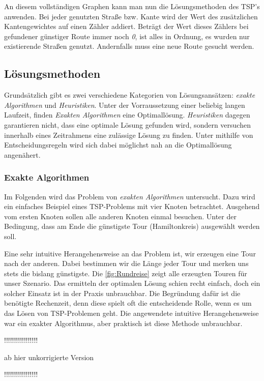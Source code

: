 \documentclass{article}
\begin{document}
An diesem vollständigen Graphen kann man nun die Lösungsmethoden des TSP's anwenden. Bei jeder genutzten Straße bzw. Kante wird der Wert des zusätzlichen Kantengewichtes auf einen Zähler addiert. Beträgt der Wert dieses Zählers bei gefundener günstiger Route immer noch \textit{0}, ist alles in Ordnung, es wurden nur existierende Straßen genutzt. Andernfalls muss eine neue Route gesucht werden.


\subsection{Lösungsmethoden}

Grundsätzlich gibt es zwei verschiedene Kategorien von Lösungsansätzen: \textit{exakte Algorithmen} und \textit{Heuristiken}. Unter der Vorraussetzung einer beliebig langen Laufzeit, finden \textit{Exakten Algorithmen} eine Optimallösung. \textit{Heuristiken} dagegen garantieren nicht, dass eine optimale Lösung gefunden wird, sondern versuchen innerhalb eines Zeitrahmens eine zulässige Lösung zu finden. Unter mithilfe von Entscheidungsregeln wird sich dabei möglichst nah an die Optimallösung angenähert.

\subsubsection{Exakte Algorithmen}
Im Folgenden wird das Problem von \textit{exakten Algorithmen} untersucht. Dazu wird ein einfaches Beispiel eines TSP-Problems mit vier Knoten betrachtet. Ausgehend vom ersten Knoten sollen alle anderen Knoten einmal besuchen. Unter der Bedingung, dass am Ende die günstigste Tour (Hamiltonkreis) ausgewählt werden soll.
\par Eine sehr intuitive Herangehensweise an das Problem ist, wir erzeugen eine Tour nach der anderen. Dabei bestimmen wir die Länge jeder Tour und merken uns stets die bislang günstigste. Die \autoref{fig:Rundreise} zeigt alle erzeugten Touren für unser Szenario. Das ermitteln der optimalen Lösung schien recht einfach, doch ein solcher Einsatz ist in der Praxis unbrauchbar. Die Begründung dafür ist die benötigte Rechenzeit, denn diese spielt oft die entscheidende Rolle, wenn es um das Lösen von TSP-Problemen geht. Die angewendete intuitive Herangehensweise war ein exakter Algorithmus, aber praktisch ist diese Methode unbrauchbar.
\par !!!!!!!!!!!!!!!!!
\par ab hier unkorrigierte Version
\par !!!!!!!!!!!!!!!!!
\end{document}
